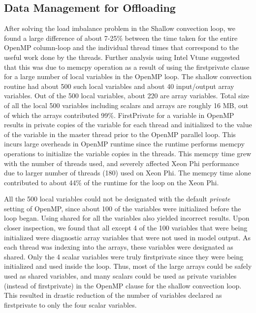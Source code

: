 \subsection{Data Management for Offloading}

After solving the load imbalance problem in the Shallow convection loop, we found a large difference of about 7-25\% between the time taken for the entire OpenMP column-loop and the individual thread times that correspond to the useful work done by the threads. Further analysis using Intel Vtune suggested that this was due to memcpy operation as a result of using the firstprivate clause for a large number of local variables in the OpenMP loop. The shallow convection routine had about 500 such local variables and about 40 input/output array variables. Out of the 500 local variables, about 220 are array variables. Total size of all the local 500 variables including scalars and arrays are roughly 16 MB, out of which the arrays contributed 99\%. FirstPrivate for a variable in OpenMP results in private copies of the variable for each thread and initialized to the value of the variable in the master thread prior to the OpenMP parallel loop. This incurs large overheads in OpenMP runtime since the runtime performs memcpy operations to initialize the variable copies in the threads. This memcpy time grew with the number of threads used, and severely affected Xeon Phi performance due to larger number of threads (180) used on Xeon Phi. The memcpy time alone contributed to about 44\% of the runtime for the loop on the Xeon Phi.

All the 500 local variables could not be designated with the default {\em private} setting of OpenMP, since about 100 of the variables were initialized before the loop began. Using shared for all the variables also yielded incorrect results. Upon closer inspection, we found that all except 4 of the 100 variables that were being initialized were diagnostic array variables that were not used in model output. As each thread was indexing into the arrays, these variables were designated as shared. Only the 4 scalar variables were truly firstprivate since they were being initialized and used inside the loop. Thus, most of the large arrays could be safely used as shared variables, and many scalars could be used as private variables (instead of firstprivate) in the OpenMP clause for the shallow convection loop. This resulted in drastic reduction of the number of variables declared as firstprivate to only the four scalar variables.




